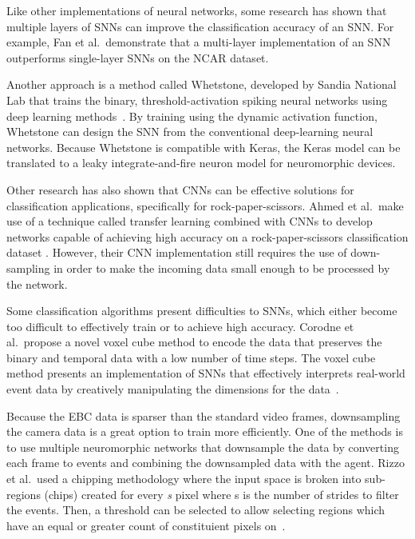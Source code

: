 \documentclass[conference]{IEEEtran}
\begin{document}
Like other implementations of neural networks, some research has shown that multiple layers of SNNs can improve the classification accuracy of an SNN. For example, Fan et al.\ demonstrate that a multi-layer implementation of an SNN outperforms single-layer SNNs on the NCAR dataset\cite{Fan_Zhang_Liu_Li_Lu_2024}.

Another approach is a method called Whetstone, developed by Sandia National Lab that trains the binary, threshold-activation spiking neural networks using deep learning methods~\cite{Severa_2019}. By training using the dynamic activation function, Whetstone can design the SNN from the conventional deep-learning neural networks. Because Whetstone is compatible with Keras, the Keras model can be translated to a leaky integrate-and-fire neuron model for neuromorphic devices.

Other research has also shown that CNNs can be effective solutions for classification applications, specifically for rock-paper-scissors. Ahmed et al.\ make use of a technique called transfer learning combined with CNNs to develop networks capable of achieving high accuracy on a rock-paper-scissors classification dataset \cite{Ahmed_Khan_Iqbal_Ahmad_Abazeed_Alrababah_Khan_2023}. However, their CNN implementation still requires the use of down-sampling in order to make the incoming data small enough to be processed by the network.

Some classification algorithms present difficulties to SNNs, which either become too difficult to effectively train or to achieve high accuracy. Corodne et al.\ propose a novel voxel cube method to encode the data that preserves the binary and temporal data with a low number of time steps. The voxel cube method presents an implementation of SNNs that effectively interprets real-world event data by creatively manipulating the dimensions for the data~\cite{9892618}.

Because the EBC data is sparser than the standard video frames, downsampling the camera data is a great option to train more efficiently. One of the methods is to use multiple neuromorphic networks that downsample the data by converting each frame to events and combining the downsampled data with the agent. Rizzo et al.\ used a chipping methodology where the input space is broken into sub-regions (chips) created for every \textit{s} pixel where s is the number of strides to filter the events. Then, a threshold can be selected to allow selecting regions which have an equal or greater count of constituient pixels on~\cite{downsampling}.
\end{document}
